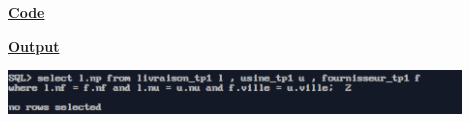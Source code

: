 \newpage
{}

\textbf{\underline{Code}}


\vspace{1cm}
\textbf{\underline{Output}}
\vspace{1cm}
\begin{center}
    \includegraphics[width=0.9\textwidth]{Questions/q19/q19.png}
\end{center}


